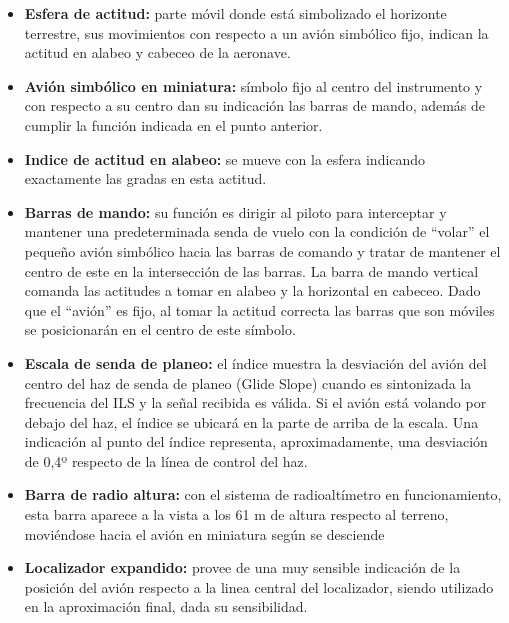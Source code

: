 \begin{itemize}
	\item {\bf Esfera de actitud: } parte m\'ovil donde est\'a simbolizado
	el horizonte terrestre, sus movimientos con respecto a un avi\'on simb\'olico
	fijo, indican la actitud en alabeo y cabeceo de la aeronave.

        \item {\bf Avi\'on simb\'olico en miniatura: } s\'imbolo fijo al centro del
	instrumento y con respecto a su centro dan su indicaci\'on las barras de mando, 
	adem\'as de cumplir la funci\'on indicada en el punto anterior.

        \item {\bf Indice de actitud en alabeo: } se mueve con la esfera indicando
	exactamente las gradas en esta actitud.

        \item {\bf Barras de mando: } su funci\'on es dirigir al piloto para interceptar
	y mantener una predeterminada senda de vuelo con la condici\'on de ``volar''
	el peque\~no avi\'on simb\'olico hacia las barras de comando y tratar de
	mantener el centro de este en la intersecci\'on de las barras.
	La barra de mando vertical comanda las actitudes a tomar en alabeo y la
	horizontal en cabeceo.
	Dado que el ``avi\'on'' es fijo, al tomar la actitud correcta las barras que
	son m\'oviles se posicionar\'an en el centro de este s\'imbolo.

        \item {\bf Escala de senda de planeo: }
	el \'indice muestra la desviaci\'on del avi\'on del centro del haz de senda de 
	planeo (Glide Slope) cuando es sintonizada la frecuencia del ILS y la se\~nal
	recibida es v\'alida. 
	Si el avi\'on est\'a volando por debajo del haz, el \'indice se ubicar\'a
	en la parte de arriba de la escala.
	Una indicaci\'on al punto del \'indice representa, aproximadamente,
	 una desviaci\'on de 0,4º
	respecto de la l\'inea de control del haz.

        \item {\bf Barra de radio altura: }
	con el sistema de radioalt\'imetro en funcionamiento, esta barra aparece
	a la vista a los 61 m de altura respecto al terreno, movi\'endose hacia el
	avi\'on en miniatura seg\'un se desciende 

        \item {\bf Localizador expandido: }
	provee de una muy sensible indicaci\'on de la posici\'on del avi\'on
	respecto a la linea central del localizador, siendo utilizado en la
	aproximaci\'on final, dada su sensibilidad.


\end{itemize}
